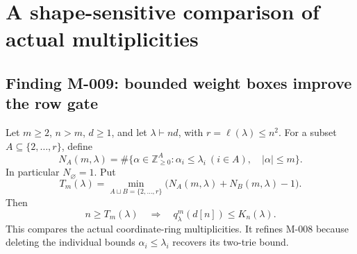 \section{A shape-sensitive comparison of actual multiplicities}

\subsection*{Finding M-009: bounded weight boxes improve the row gate}
Let \(m\geq2\), \(n>m\), \(d\geq1\), and let
\(\lambda\vdash nd\), with \(r=\ell(\lambda)\leq n^2\).
For a subset \(A\subseteq\{2,\ldots,r\}\), define
\[
 N_A(m,\lambda)=
 \#\{\alpha\in\mathbb Z_{\geq0}^{A}:
       \alpha_i\leq\lambda_i\ (i\in A),\quad |\alpha|\leq m\}.
\]
In particular \(N_\varnothing=1\). Put
\[
 T_m(\lambda)=
 \min_{A\sqcup B=\{2,\ldots,r\}}
       \bigl(N_A(m,\lambda)+N_B(m,\lambda)-1\bigr).
\]
Then
\begin{equation}\label{eq:M009}
 n\geq T_m(\lambda)
 \quad\Longrightarrow\quad
 q^m_\lambda(d[n])\leq K_n(\lambda).
\end{equation}
This compares the actual coordinate-ring multiplicities. It refines
M-008 because deleting the individual bounds \(\alpha_i\leq\lambda_i\)
recovers its two-trie bound.

